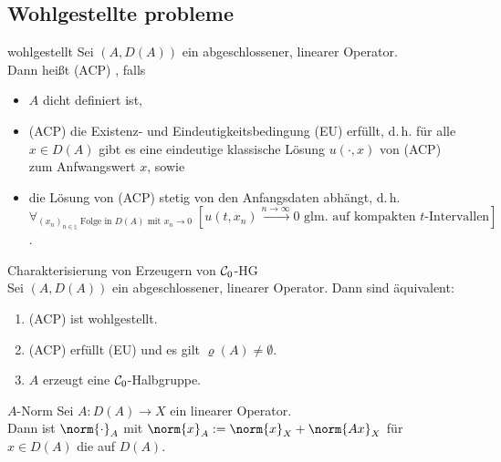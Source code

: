 \subsection{%
    Wohlgestellte probleme%
}

\begin{Def}{wohlgestellt}
    Sei $(A, D(A))$ ein abgeschlossener, linearer Operator.\\
    Dann heißt (ACP) , falls
    \begin{itemize}
        \item
        $A$ dicht definiert ist,
        
        \item
        (ACP) die Existenz- und Eindeutigkeitsbedingung (EU) erfüllt, d.\,h.
        für alle $x \in D(A)$ gibt es eine eindeutige klassische Lösung
        $u(\cdot, x)$ von (ACP) zum Anfwangswert $x$, sowie
        
        \item
        die Lösung von (ACP) stetig von den Anfangsdaten abhängt, d.\,h.\\
        $\forall_{\text{$(x_n)_{n \in \natural}$ Folge in $D(A)$ mit $x_n \to 0$}}\;
        [\text{$u(t, x_n) \xrightarrow{n \to \infty} 0$ glm. auf kompakten $t$-Intervallen}]$.
    \end{itemize}
\end{Def}

\begin{Satz}{Charakterisierung von Erzeugern von $\mathcal{C}_0$-HG}\\
    Sei $(A, D(A))$ ein abgeschlossener, linearer Operator.
    Dann sind äquivalent:
    \begin{enumerate}
        \item
        (ACP) ist wohlgestellt.
        
        \item
        (ACP) erfüllt (EU) und es gilt $\varrho(A) \not= \emptyset$.
        
        \item
        $A$ erzeugt eine $\mathcal{C}_0$-Halbgruppe.
    \end{enumerate}
\end{Satz}

\linie

\begin{Def}{$A$-Norm}
    Sei $A\colon D(A) \to X$ ein linearer Operator.\\
    Dann ist $\norm{\cdot}_A$ mit $\norm{x}_A := \norm{x}_X + \norm{Ax}_X$ für $x \in D(A)$
    die  auf $D(A)$.
\end{Def}

